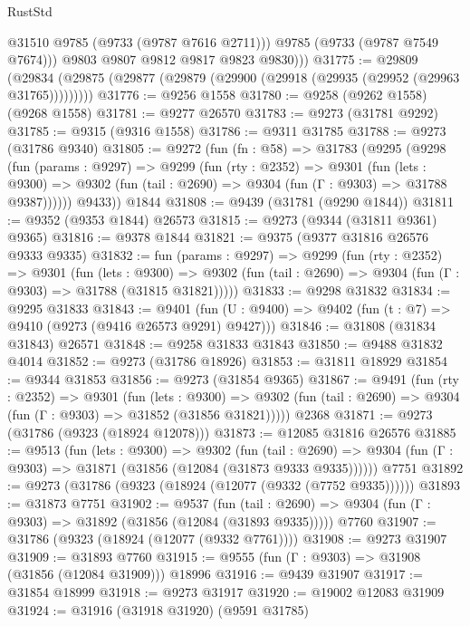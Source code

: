 \begin{lexlean}{RustStd}
\begin{coremodule}
              @31510
              @9785
              (@9733 (@9787 @7616 @2711)))
            @9785
            (@9733 (@9787 @7549 @7674)))
          @9803
          @9807
          @9812
          @9817
          @9823
          @9830)))
@31775 := @29809
    (@29834 (@29875 (@29877 (@29879 (@29900 (@29918 (@29935 (@29952 (@29963 @31765)))))))))
@31776 := @9256 @1558
@31780 := @9258 (@9262 @1558) (@9268 @1558)
@31781 := @9277 @26570
@31783 := @9273 (@31781 @9292)
@31785 := @9315 (@9316 @1558)
@31786 := @9311 @31785
@31788 := @9273 (@31786 @9340)
@31805 := @9272
    (fun (fn : @58) =>
    @31783
      (@9295
        (@9298
          (fun (params : @9297) =>
          @9299
            (fun (rty : @2352) =>
            @9301
              (fun (lets : @9300) =>
              @9302 (fun (tail : @2690) => @9304 (fun (Γ : @9303) => @31788 @9387))))))
        @9433))
    @1844
@31808 := @9439 (@31781 (@9290 @1844))
@31811 := @9352 (@9353 @1844) @26573
@31815 := @9273 (@9344 (@31811 @9361) @9365)
@31816 := @9378 @1844
@31821 := @9375 (@9377 @31816 @26576 @9333 @9335)
@31832 := fun (params : @9297) =>
  @9299
    (fun (rty : @2352) =>
    @9301
      (fun (lets : @9300) =>
      @9302 (fun (tail : @2690) => @9304 (fun (Γ : @9303) => @31788 (@31815 @31821)))))
@31833 := @9298 @31832
@31834 := @9295 @31833
@31843 := @9401
    (fun (U : @9400) => @9402 (fun (t : @7) => @9410 (@9273 (@9416 @26573 @9291) @9427)))
@31846 := @31808 (@31834 @31843) @26571
@31848 := @9258 @31833 @31843
@31850 := @9488 @31832 @4014
@31852 := @9273 (@31786 @18926)
@31853 := @31811 @18929
@31854 := @9344 @31853
@31856 := @9273 (@31854 @9365)
@31867 := @9491
    (fun (rty : @2352) =>
    @9301
      (fun (lets : @9300) =>
      @9302 (fun (tail : @2690) => @9304 (fun (Γ : @9303) => @31852 (@31856 @31821)))))
    @2368
@31871 := @9273 (@31786 (@9323 (@18924 @12078)))
@31873 := @12085 @31816 @26576
@31885 := @9513
    (fun (lets : @9300) =>
    @9302
      (fun (tail : @2690) =>
      @9304 (fun (Γ : @9303) => @31871 (@31856 (@12084 (@31873 @9333 @9335))))))
    @7751
@31892 := @9273 (@31786 (@9323 (@18924 (@12077 (@9332 (@7752 @9335))))))
@31893 := @31873 @7751
@31902 := @9537
    (fun (tail : @2690) => @9304 (fun (Γ : @9303) => @31892 (@31856 (@12084 (@31893 @9335)))))
    @7760
@31907 := @31786 (@9323 (@18924 (@12077 (@9332 @7761))))
@31908 := @9273 @31907
@31909 := @31893 @7760
@31915 := @9555 (fun (Γ : @9303) => @31908 (@31856 (@12084 @31909))) @18996
@31916 := @9439 @31907
@31917 := @31854 @18999
@31918 := @9273 @31917
@31920 := @19002 @12083 @31909
@31924 := @31916 (@31918 @31920) (@9591 @31785)

\end{coremodule}
\end{lexlean}

